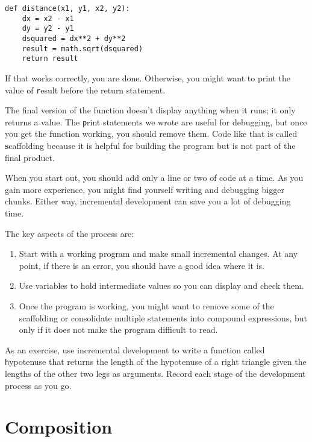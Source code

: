 \documentclass[
DIV=11,
fontsize=12,
twoside,
headinclude=false,
titlepage=firstiscover,
abstract=true,
headsepline=true,
footsepline=true,
chapterprefix=true, %
headings=big,
bibliography=totoc,%
captions=tableheading
]{scrbook}
\theoremstyle{definition}
\begin{document}
\begin{lstlisting}
def distance(x1, y1, x2, y2):
    dx = x2 - x1
    dy = y2 - y1
    dsquared = dx**2 + dy**2
    result = math.sqrt(dsquared)
    return result
\end{lstlisting}
%
If that works correctly, you are done.  Otherwise, you might
want to print the value of {\texttt result} before the return
statement.

The final version of the function doesn't display anything when it
runs; it only returns a value.  The {\texttt print} statements we wrote
are useful for debugging, but once you get the function working, you
should remove them.  Code like that is called {\textbf scaffolding}
because it is helpful for building the program but is not part of the
final product.

When you start out, you should add only a line or two of code at a
time.  As you gain more experience, you might find yourself writing
and debugging bigger chunks.  Either way, incremental development
can save you a lot of debugging time.

The key aspects of the process are:

\begin{enumerate}

\item Start with a working program and make small incremental changes. 
At any point, if there is an error, you should have a good idea
where it is.

\item Use variables to hold intermediate values so you can
display and check them.

\item Once the program is working, you might want to remove some of
the scaffolding or consolidate multiple statements into compound
expressions, but only if it does not make the program difficult to
read.

\end{enumerate}

As an exercise, use incremental development to write a function
called {\texttt hypotenuse} that returns the length of the hypotenuse of a
right triangle given the lengths of the other two legs as arguments.
Record each stage of the development process as you go.



\section{Composition}
\end{document}
